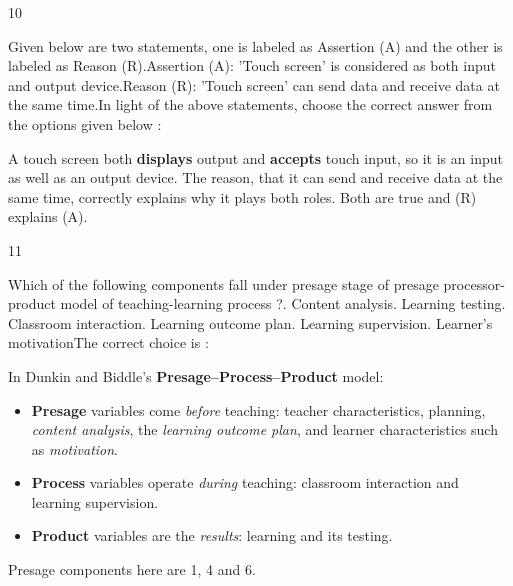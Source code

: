 \begin{question}{10}
{Given below are two statements, one is labeled as Assertion (A) and the other is labeled as Reason (R).\newline Assertion (A): 'Touch screen' is considered as both input and output device.\newline Reason (R): 'Touch screen' can send data and receive data at the same time.\newline In light of the above statements, choose the correct answer from the options given below :\par}
\begin{explain}
A touch screen both \textbf{displays} output and \textbf{accepts} touch input, so it is an input as well as an output device. The reason, that it can send and receive data at the same time, correctly explains why it plays both roles. Both are true and (R) explains (A).
\end{explain}
\end{question}

\begin{question}{11}
{Which of the following components fall under presage stage of presage processor-product model of teaching-learning process ?. Content analysis. Learning testing. Classroom interaction. Learning outcome plan. Learning supervision. Learner's motivation\newline The correct choice is :\par}
\begin{explain}
In Dunkin and Biddle's \textbf{Presage--Process--Product} model:
\begin{itemize}
\item \textbf{Presage} variables come \emph{before} teaching: teacher characteristics, planning, \emph{content analysis}, the \emph{learning outcome plan}, and learner characteristics such as \emph{motivation}.
\item \textbf{Process} variables operate \emph{during} teaching: classroom interaction and learning supervision.
\item \textbf{Product} variables are the \emph{results}: learning and its testing.
\end{itemize}
Presage components here are 1, 4 and 6.
\end{explain}
\end{question}

